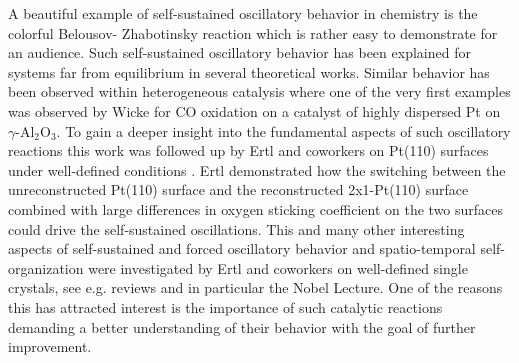 \documentclass[journal=jacsat,manuscript=article]{achemso}
\begin{document}
A beautiful example of self-sustained oscillatory behavior in chemistry is the
colorful Belousov- Zhabotinsky reaction\cite{ZAIKIN1970} which is rather easy
to demonstrate for an audience. Such self-sustained oscillatory behavior has
been explained for systems far from equilibrium in several theoretical
works\cite{HakenBog,NicolisBog}. Similar behavior has been observed within
heterogeneous catalysis where one of the very first examples was observed by Wicke
for CO oxidation on a catalyst
of highly dispersed Pt on $\gamma$-Al$_2$O$_3$\cite{BEUSCH1972}. To gain a
deeper insight into the fundamental aspects of such oscillatory reactions this
work was followed up by Ertl and coworkers on Pt(110) surfaces under well-defined conditions
\cite{EISWIRTH1986}. Ertl demonstrated how the switching between the
unreconstructed Pt(110) surface and the reconstructed 2x1-Pt(110) surface
combined with large differences in oxygen sticking coefficient on the two surfaces
could drive the self-sustained oscillations. This and many other interesting
aspects of self-sustained and forced oscillatory behavior and spatio-temporal
self-organization were investigated by Ertl and coworkers on well-defined
single crystals, see e.g. reviews\cite{IMBIHL1995,JAKUBITH1990} and in
particular the Nobel Lecture\cite{Ertl2008}. One of the reasons this has
attracted interest is the importance of such catalytic reactions demanding a
better understanding of their behavior with the goal of further improvement. 
\end{document}
